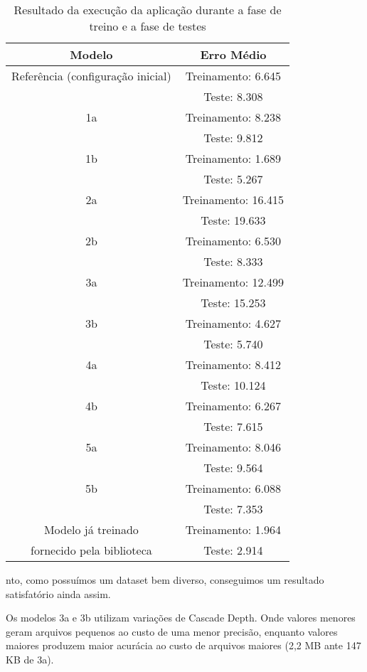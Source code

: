 \documentclass[twoside,conference,a4paper]{IEEEtran}
\begin{document}
\begin{table}[]
    \centering
    \begin{tabular}{|cc|}
    Modelo & Erro Médio \\
    \hline
    Referência (configuração inicial) & Treinamento: 6.645\\ 
    & Teste: 8.308\\ 
    \hline
    1a & Treinamento: 8.238\\ 
    & Teste: 9.812\\ 
    \hline 
    1b & Treinamento: 1.689\\ 
    & Teste: 5.267\\ 
    \hline 
    2a & Treinamento: 16.415\\ 
    & Teste: 19.633\\ 
    \hline 
    2b & Treinamento: 6.530\\ 
    & Teste: 8.333\\ 
    \hline 
    3a & Treinamento: 12.499\\ 
    & Teste: 15.253\\ 
    \hline 
    3b & Treinamento: 4.627\\ 
    & Teste: 5.740\\ 
    \hline 
    4a & Treinamento: 8.412\\ 
    & Teste: 10.124\\ 
    \hline 
    4b & Treinamento: 6.267\\ 
    & Teste: 7.615\\ 
    \hline 
    5a & Treinamento: 8.046\\ 
    & Teste: 9.564\\ 
    \hline 
    5b & Treinamento: 6.088\\ 
    & Teste: 7.353\\ 
    \hline 
    Modelo já treinado & Treinamento: 1.964\\ 
    fornecido pela biblioteca& Teste: 2.914\\ 
    \hline 
    \end{tabular}
    \caption{Resultado da execução da aplicação durante a fase de treino e a fase de testes}
    \label{tab:results}
\end{table}
nto, como possuímos um dataset bem diverso, conseguimos um resultado satisfatório ainda assim.

Os modelos 3a e 3b utilizam variações de Cascade Depth. Onde valores menores geram arquivos pequenos ao custo de uma menor precisão, enquanto valores maiores produzem maior acurácia ao custo de arquivos maiores (2,2 MB ante 147 KB de 3a).
\end{document}
